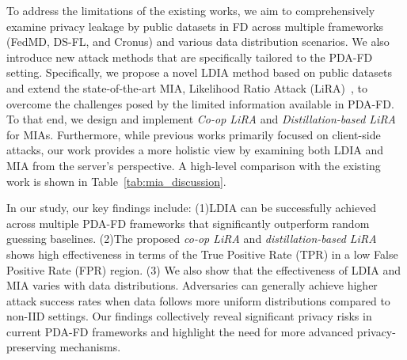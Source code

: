 To address the limitations of the existing works, 
we aim to comprehensively examine privacy leakage by public datasets in FD across multiple frameworks (FedMD, DS-FL, and Cronus) and various data distribution scenarios.
We also introduce new attack methods that are specifically tailored to the PDA-FD setting.
Specifically, we propose a novel LDIA method based on public datasets and extend the state-of-the-art MIA, Likelihood Ratio Attack (LiRA)~\cite{carlini2022membership}, to overcome the challenges posed by the limited information available in PDA-FD.
To that end, we design and implement \textit{Co-op LiRA} and \textit{Distillation-based LiRA} for MIAs.
Furthermore, while previous works primarily focused on client-side attacks, our work provides a more holistic view by examining both LDIA and MIA from the server's perspective.
A high-level comparison with the existing work is shown in Table~\ref{tab:mia_discussion}.
\begin{table}[h]
    \caption{Summary of Privacy Attacks in FL \& FD}
    \centering
    \label{tab:mia_discussion}
\end{table}

In our study, our key findings include:
(1)LDIA can be successfully achieved across multiple PDA-FD frameworks that significantly outperform random guessing baselines.
(2)The proposed \textit{co-op LiRA} and \textit{distillation-based LiRA} shows high effectiveness in terms of the True Positive Rate (TPR) in a low False Positive Rate (FPR) region.
(3) We also show that the effectiveness of LDIA and MIA varies with data distributions. Adversaries can generally achieve higher attack success rates when data follows more uniform distributions compared to non-IID settings.
Our findings collectively reveal significant privacy risks in current PDA-FD frameworks and highlight the need for more advanced privacy-preserving mechanisms.

